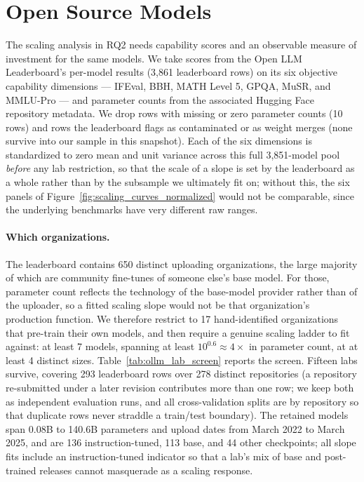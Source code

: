 \section{Open Source Models}
\label{app:open_source_models}

The scaling analysis in RQ2 needs capability scores and an observable measure of
investment for the same models. We take scores from the Open LLM Leaderboard's
per-model results (3,861 leaderboard rows) on its six objective capability
dimensions --- IFEval, BBH, MATH Level 5, GPQA, MuSR, and MMLU-Pro --- and
parameter counts from the associated Hugging Face repository metadata. We drop
rows with missing or zero parameter counts (10 rows) and rows the leaderboard
flags as contaminated or as weight merges (none survive into our sample in this
snapshot). Each of the six dimensions is standardized to zero mean and unit
variance across this full 3,851-model pool \emph{before} any lab restriction, so
that the scale of a slope is set by the leaderboard as a whole rather than by
the subsample we ultimately fit on; without this, the six panels of
Figure~\ref{fig:scaling_curves_normalized} would not be comparable, since the
underlying benchmarks have very different raw ranges.

\paragraph{Which organizations.} The leaderboard contains 650 distinct uploading
organizations, the large majority of which are community fine-tunes of someone
else's base model. For those, parameter count reflects the technology of the
base-model provider rather than of the uploader, so a fitted scaling slope would
not be that organization's production function. We therefore restrict to 17
hand-identified organizations that pre-train their own models, and then require
a genuine scaling ladder to fit against: at least 7 models, spanning at least
$10^{0.6}\approx4\times$ in parameter count, at at least 4 distinct sizes.
Table~\ref{tab:ollm_lab_screen} reports the screen. Fifteen labs survive,
covering 293 leaderboard rows over 278 distinct repositories (a repository
re-submitted under a later revision contributes more than one row; we keep both
as independent evaluation runs, and all cross-validation splits are by
repository so that duplicate rows never straddle a train/test boundary). The
retained models span 0.08B to 140.6B parameters and upload dates from March 2022
to March 2025, and are 136 instruction-tuned, 113 base, and 44 other
checkpoints; all slope fits include an instruction-tuned indicator so that a
lab's mix of base and post-trained releases cannot masquerade as a scaling
response.

